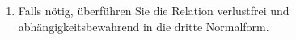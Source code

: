 \documentclass{lehramt-informatik-aufgabe}
\begin{document}
\begin{enumerate}
\begin{liAntwort}
\begin{enumerate}

\item {}

\item {}


\end{enumerate}
\end{liAntwort}

\item Falls nötig, überführen Sie die Relation verlustfrei und
abhängigkeitsbewahrend in die dritte Normalform.
\end{enumerate}
\end{document}
